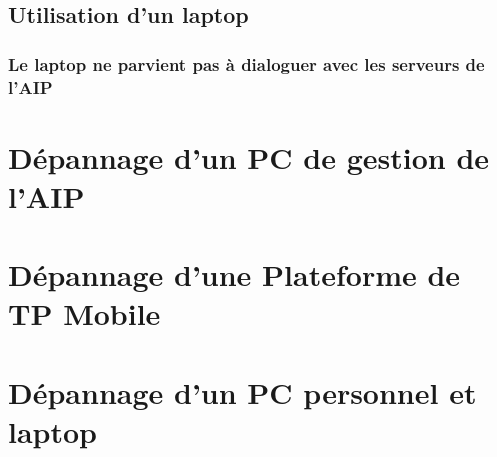 \documentclass[a4paper]{article}
\begin{document}
\subsection{Utilisation d'un laptop}

\subsubsection{Le laptop ne parvient pas à dialoguer avec les serveurs de l'AIP}
		

\section{Dépannage d'un PC de gestion de l'AIP}

\section{Dépannage d'une Plateforme de TP Mobile}

\section{Dépannage d'un PC personnel et laptop}
\end{document}
